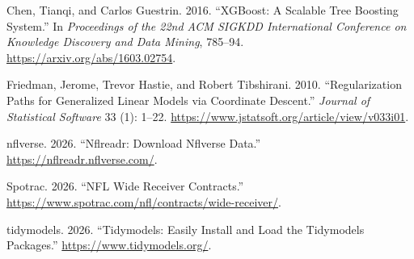 \documentclass[
  10pt,
]{article}
\newlength{\cslhangindent}
\newenvironment{CSLReferences}[2] %
 {\begin{list}{}{%
  \setlength{\itemindent}{0pt}
  \setlength{\leftmargin}{0pt}
  \setlength{\parsep}{0pt}
  \ifodd #1
   \setlength{\leftmargin}{\cslhangindent}
   \setlength{\itemindent}{-1\cslhangindent}
  \fi
  \setlength{\itemsep}{#2\baselineskip}}}
 {\end{list}}
\begin{document}
\label{refs}
\begin{CSLReferences}{1}{0}
Chen, Tianqi, and Carlos Guestrin. 2016. {``XGBoost: A Scalable Tree Boosting System.''} In \emph{Proceedings of the 22nd ACM SIGKDD International Conference on Knowledge Discovery and Data Mining}, 785--94. \url{https://arxiv.org/abs/1603.02754}.

Friedman, Jerome, Trevor Hastie, and Robert Tibshirani. 2010. {``Regularization Paths for Generalized Linear Models via Coordinate Descent.''} \emph{Journal of Statistical Software} 33 (1): 1--22. \url{https://www.jstatsoft.org/article/view/v033i01}.

nflverse. 2026. {``Nflreadr: Download Nflverse Data.''} \url{https://nflreadr.nflverse.com/}.

Spotrac. 2026. {``NFL Wide Receiver Contracts.''} \url{https://www.spotrac.com/nfl/contracts/wide-receiver/}.

tidymodels. 2026. {``Tidymodels: Easily Install and Load the Tidymodels Packages.''} \url{https://www.tidymodels.org/}.

\end{CSLReferences}
\end{document}
